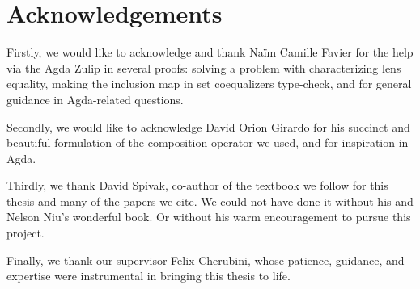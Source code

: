 \thispagestyle{plain}			%
\section*{Acknowledgements}
Firstly, we would like to acknowledge and thank Naïm Camille Favier for the help via the Agda Zulip in several proofs: solving a problem with characterizing lens equality, making the inclusion map in set coequalizers type-check, and for general guidance in Agda-related questions.


Secondly, we would like to acknowledge David Orion Girardo for his succinct and beautiful formulation of the composition operator we used, and for inspiration in Agda.


Thirdly, we thank David Spivak, co-author of the textbook we follow for this thesis and many of the papers we cite. We could not have done it without his and Nelson Niu's wonderful book. Or without his warm encouragement to pursue this project.

Finally, we thank our supervisor Felix Cherubini, whose patience, guidance, and expertise were instrumental in bringing this thesis to life.


\newpage				%
\thispagestyle{empty}
\mbox{}